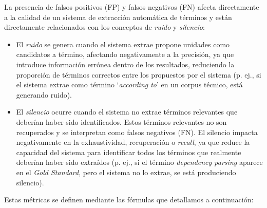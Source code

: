 La presencia de falsos positivos (FP) y falsos negativos (FN) afecta directamente a la calidad de un sistema de extracción automática de términos y están directamente relacionados con los conceptos de \textit{ruido} y \textit{silencio}:

\begin{itemize}
    \item El \textit{ruido} se genera cuando el sistema extrae propone unidades como candidatos a término, afectando negativamente a la precisión, ya que introduce información errónea dentro de los resultados, reduciendo la proporción de términos correctos entre los propuestos por el sistema (p. ej., si el sistema extrae como término ‘\textit{according to}’ en un corpus técnico, está generando ruido).
    \item El \textit{silencio} ocurre cuando el sistema no extrae términos relevantes que deberían haber sido identificados. Estos términos relevantes no son recuperados y se interpretan como falsos negativos (FN). El silencio impacta negativamente en la exhaustividad, recuperación o \textit{recall}, ya que reduce la capacidad del sistema para identificar todos los términos que realmente deberían haber sido extraídos (p. ej., si el término \textit{dependency parsing} aparece en el \textit{Gold Standard}, pero el sistema no lo extrae, se está produciendo silencio).
\end{itemize}

Estas métricas se definen mediante las fórmulas que detallamos a continuación:

